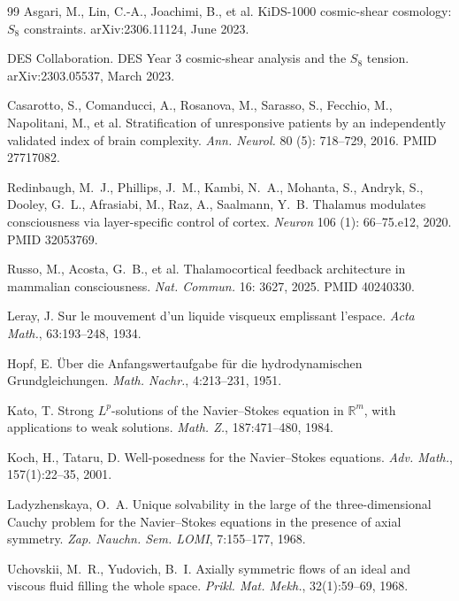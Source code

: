 \documentclass[11pt,a4paper]{amsart}
\theoremstyle{plain}
\theoremstyle{definition}
\begin{document}
\begin{thebibliography}{99}
Asgari, M., Lin, C.-A., Joachimi, B., et al.
\newblock KiDS-1000 cosmic-shear cosmology: $S_8$ constraints.
\newblock arXiv:2306.11124, June 2023.

DES Collaboration.
\newblock DES Year 3 cosmic-shear analysis and the $S_8$ tension.
\newblock arXiv:2303.05537, March 2023.

Casarotto, S., Comanducci, A., Rosanova, M., Sarasso, S., Fecchio, M., Napolitani, M., et al.
\newblock Stratification of unresponsive patients by an independently validated index of brain complexity.
\newblock \emph{Ann. Neurol.} 80 (5): 718--729, 2016. PMID 27717082.

Redinbaugh, M.~J., Phillips, J.~M., Kambi, N.~A., Mohanta, S., Andryk, S., Dooley, G.~L., Afrasiabi, M., Raz, A., Saalmann, Y.~B.
\newblock Thalamus modulates consciousness via layer-specific control of cortex.
\newblock \emph{Neuron} 106 (1): 66--75.e12, 2020. PMID 32053769.

Russo, M., Acosta, G.~B., et al.
\newblock Thalamocortical feedback architecture in mammalian consciousness.
\newblock \emph{Nat. Commun.} 16: 3627, 2025. PMID 40240330.

Leray, J.
\newblock Sur le mouvement d'un liquide visqueux emplissant l'espace.
\newblock \emph{Acta Math.}, 63:193--248, 1934.

Hopf, E.
\newblock \"Uber die Anfangswertaufgabe f\"ur die hydrodynamischen Grundgleichungen.
\newblock \emph{Math. Nachr.}, 4:213--231, 1951.

Kato, T.
\newblock Strong $L^p$-solutions of the Navier--Stokes equation in $\mathbb{R}^m$, with applications to weak solutions.
\newblock \emph{Math. Z.}, 187:471--480, 1984.

Koch, H., Tataru, D.
\newblock Well-posedness for the Navier--Stokes equations.
\newblock \emph{Adv. Math.}, 157(1):22--35, 2001.

Ladyzhenskaya, O.~A.
\newblock Unique solvability in the large of the three-dimensional Cauchy problem for the Navier--Stokes equations in the presence of axial symmetry.
\newblock \emph{Zap. Nauchn. Sem. LOMI}, 7:155--177, 1968.

Uchovskii, M.~R., Yudovich, B.~I.
\newblock Axially symmetric flows of an ideal and viscous fluid filling the whole space.
\newblock \emph{Prikl. Mat. Mekh.}, 32(1):59--69, 1968.


\end{thebibliography}
\end{document}
